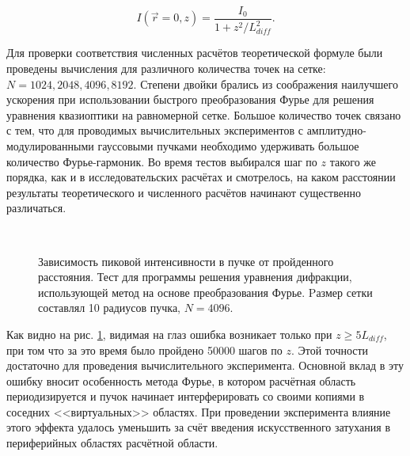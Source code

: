 \begin{equation}
I(\vec{r} = 0, z) = \frac{I_0}{1 + z^2/L_{diff}^2}.
\end{equation}

Для проверки соответствия численных расчётов теоретической формуле были проведены
вычисления для различного количества точек на сетке: $N = 1024, 2048, 4096, 8192$. Степени
двойки брались из соображения наилучшего ускорения при использовании быстрого преобразования
Фурье для решения  уравнения квазиоптики на равномерной сетке.
Большое количество точек связано с тем, что для проводимых вычислительных экспериментов
с амплитудно-модулированными гауссовыми пучками необходимо удерживать большое количество Фурье-гармоник.
Во время тестов выбирался шаг по $z$ такого же порядка, как и в исследовательских расчётах
и смотрелось, на каком расстоянии результаты теоретического и численного расчётов начинают существенно различаться.


\begin{figure}[H]
    \begin{center}
        \begin{minipage}{\minipagewidthtwo}
        \end{minipage}
        \\[1ex]
        \caption{Зависимость пиковой интенсивности в пучке от пройденного расстояния.
                 Тест для программы решения уравнения дифракции, использующей метод на основе преобразования Фурье.
                 Pазмер сетки составлял 10 радиусов пучка, $N = 4096$.}
        \label{fig:ModelTestIntensity}
    \end{center}
\end{figure}


Как видно на рис. \ref{fig:ModelTestIntensity}, видимая на глаз ошибка возникает только при $z \geq 5 L_{diff}$,
при том что за это время было пройдено 50000 шагов по $z$. Этой точности достаточно для проведения вычислительного эксперимента.
Основной вклад в эту ошибку вносит особенность метода Фурье, в котором расчётная область периодизируется
и пучок начинает интерферировать со своими копиями в соседних <<виртуальных>> областях. При проведении эксперимента
влияние этого эффекта удалось уменьшить за счёт введения искусственного затухания в периферийных областях расчётной области.

